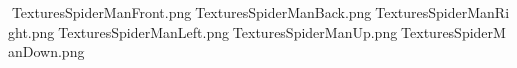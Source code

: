    T e x t u r e s \ S p i d e r M a n \ F r o n t . p n g    T e x t u r e s \ S p i d e r M a n \ B a c k . p n g    T e x t u r e s \ S p i d e r M a n \ R i g h t . p n g    T e x t u r e s \ S p i d e r M a n \ L e f t . p n g    T e x t u r e s \ S p i d e r M a n \ U p . p n g    T e x t u r e s \ S p i d e r M a n \ D o w n . p n g 
